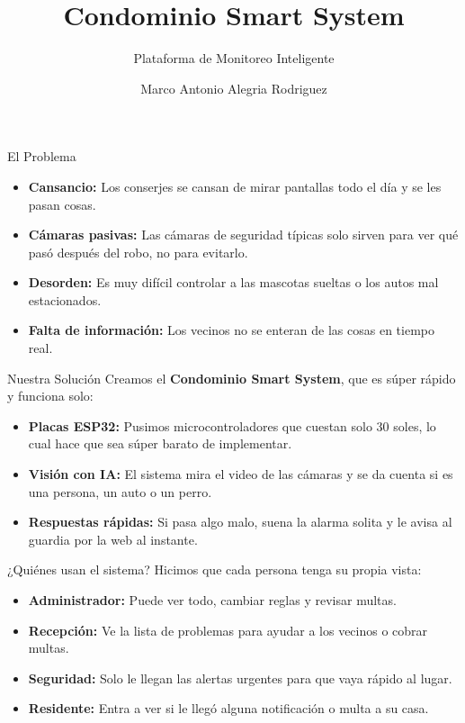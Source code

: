 \documentclass[aspectratio=169]{beamer}
\title{Condominio Smart System}
\subtitle{Plataforma de Monitoreo Inteligente}
\author{Marco Antonio Alegria Rodriguez}
\date{}
\begin{document}
\maketitle

\begin{frame}{El Problema}
\begin{itemize}
    \item \textbf{Cansancio:} Los conserjes se cansan de mirar pantallas todo el día y se les pasan cosas.
    \item \textbf{Cámaras pasivas:} Las cámaras de seguridad típicas solo sirven para ver qué pasó después del robo, no para evitarlo.
    \item \textbf{Desorden:} Es muy difícil controlar a las mascotas sueltas o los autos mal estacionados.
    \item \textbf{Falta de información:} Los vecinos no se enteran de las cosas en tiempo real.
\end{itemize}
\end{frame}

\begin{frame}{Nuestra Solución}
Creamos el \textbf{Condominio Smart System}, que es súper rápido y funciona solo:
\vspace{0.5cm}
\begin{itemize}
    \item \textbf{Placas ESP32:} Pusimos microcontroladores que cuestan solo 30 soles, lo cual hace que sea súper barato de implementar.
    \item \textbf{Visión con IA:} El sistema mira el video de las cámaras y se da cuenta si es una persona, un auto o un perro.
    \item \textbf{Respuestas rápidas:} Si pasa algo malo, suena la alarma solita y le avisa al guardia por la web al instante.
\end{itemize}
\end{frame}

\begin{frame}{¿Quiénes usan el sistema?}
Hicimos que cada persona tenga su propia vista:
\vspace{0.5cm}
\begin{itemize}
    \item \textbf{Administrador:} Puede ver todo, cambiar reglas y revisar multas.
    \item \textbf{Recepción:} Ve la lista de problemas para ayudar a los vecinos o cobrar multas.
    \item \textbf{Seguridad:} Solo le llegan las alertas urgentes para que vaya rápido al lugar.
    \item \textbf{Residente:} Entra a ver si le llegó alguna notificación o multa a su casa.
\end{itemize}
\end{frame}
\end{document}
